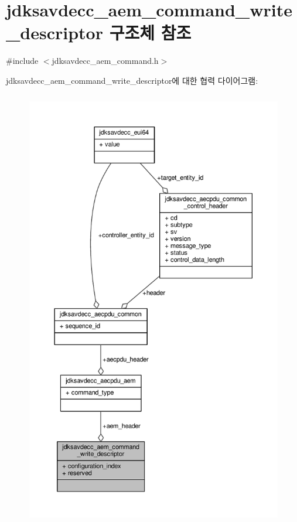 \hypertarget{structjdksavdecc__aem__command__write__descriptor}{}\section{jdksavdecc\+\_\+aem\+\_\+command\+\_\+write\+\_\+descriptor 구조체 참조}
\label{structjdksavdecc__aem__command__write__descriptor}


{\ttfamily \#include $<$jdksavdecc\+\_\+aem\+\_\+command.\+h$>$}



jdksavdecc\+\_\+aem\+\_\+command\+\_\+write\+\_\+descriptor에 대한 협력 다이어그램\+:
\nopagebreak
\begin{figure}[H]
\begin{center}
\leavevmode
\includegraphics[height=550pt]{structjdksavdecc__aem__command__write__descriptor__coll__graph}
\end{center}
\end{figure}
